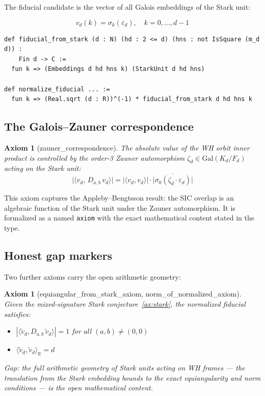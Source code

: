 \documentclass[12pt,a4paper]{article}
\newtheorem{axiom_env}[theorem]{Axiom}
\begin{document}
The fiducial candidate is the vector of all Galois embeddings of the Stark unit:

\[
v_d(k) = \sigma_k(\varepsilon_d),\quad k = 0,\ldots,d-1
\]

\begin{lstlisting}
def fiducial_from_stark (d : N) (hd : 2 <= d) (hns : not IsSquare (m_d d)) :
    Fin d -> C :=
  fun k => (Embeddings d hd hns k) (StarkUnit d hd hns)

def normalize_fiducial ... :=
  fun k => (Real.sqrt (d : R))^(-1) * fiducial_from_stark d hd hns k
\end{lstlisting}

\subsection{The Galois--Zauner correspondence}

\begin{axiom_env}[zauner\_correspondence]
\label{ax:zauner-corr}
The absolute value of the WH orbit inner product is controlled by the
order-3 Zauner automorphism $\zeta_d \in \mathrm{Gal}(K_d/F_d)$ acting
on the Stark unit:
\[
\big|\langle v_d,\, D_{a,b}\,v_d\rangle\big|
= \big|\langle v_d, v_d\rangle\big| \cdot
\big|\overline{\sigma_0(\zeta_d \cdot \varepsilon_d)}\big|
\]
\end{axiom_env}

This axiom captures the Appleby--Bengtsson result: the SIC overlap is an
algebraic function of the Stark unit under the Zauner automorphism.  It is
formalized as a named \texttt{axiom} with the exact mathematical content
stated in the type.

\subsection{Honest gap markers}

Two further axioms carry the open arithmetic geometry:

\begin{axiom_env}[equiangular\_from\_stark\_axiom, norm\_of\_normalized\_axiom]
\label{ax:gap}
Given the mixed-signature Stark conjecture~\ref{ax:stark}, the normalized
fiducial satisfies:
\begin{itemize}
  \item $|\langle \tilde{v}_d, D_{a,b}\,\tilde{v}_d\rangle| = 1$ for all $(a,b)\neq(0,0)$
  \item $\langle\tilde{v}_d, \tilde{v}_d\rangle_{\mathbb{R}} = d$
\end{itemize}
\emph{Gap:} the full arithmetic geometry of Stark units acting on WH frames --- the
translation from the Stark embedding bounds to the exact equiangularity and norm
conditions --- is the open mathematical content.
\end{axiom_env}
\end{document}
